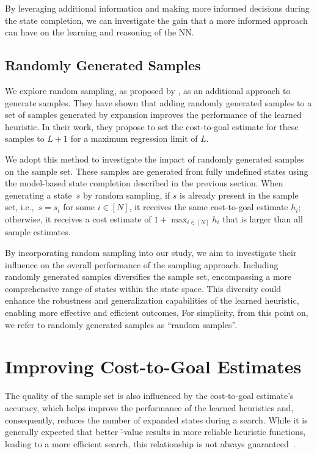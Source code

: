 By leveraging additional information and making more informed decisions during the state completion, we can investigate the gain that a more informed approach can have on the learning and reasoning of the NN.

\subsection{Randomly Generated Samples}
\label{sec:random-samples}

We explore random sampling, as proposed by \citet{otoole2022sampling}, as an additional approach to generate samples. They have shown that adding randomly generated samples to a set of samples generated by expansion improves the performance of the learned heuristic. In their work, they propose to set the cost-to-goal estimate for these samples to $L+1$ for a maximum regression limit of $L$.

We adopt this method to investigate the impact of randomly generated samples on the sample set. These samples are generated from fully undefined states using the model-based state completion described in the previous section. When generating a state~$s$ by random sampling, if $s$ is already present in the sample set, i.e.,~$s = s_i$ for some $i\in[N]$, it receives the same cost-to-goal estimate $h_i$; otherwise, it receives a cost estimate of $1+\max_{i\in[N]} h_i$ that is larger than all sample estimates.

By incorporating random sampling into our study, we aim to investigate their influence on the overall performance of the sampling approach. Including randomly generated samples diversifies the sample set, encompassing a more comprehensive range of states within the state space. This diversity could enhance the robustness and generalization capabilities of the learned heuristic, enabling more effective and efficient outcomes. For simplicity, from this point on, we refer to randomly generated samples as ``random samples''.

\section{Improving Cost-to-Goal Estimates}
\label{sec:cost-to-goal-estimates}

The quality of the sample set is also influenced by the cost-to-goal estimate's accuracy, which helps improve the performance of the learned heuristics and, consequently, reduces the number of expanded states during a search. While it is generally expected that better \h-value results in more reliable heuristic functions, leading to a more efficient search, this relationship is not always guaranteed~\cite{holte2010common}.

